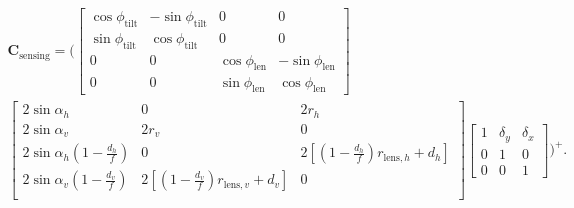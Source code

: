 \begin{multline}
	\mathbf{C}_\mathrm{sensing}
	=
	\Biggl(
	\begin{bmatrix}
		\cos\phi_\mathrm{tilt} & -\sin\phi_\mathrm{tilt} & 0 & 0\\
		\sin\phi_\mathrm{tilt} & \cos\phi_\mathrm{tilt} & 0 & 0\\
		0 & 0 & \cos\phi_\mathrm{len} & -\sin\phi_\mathrm{len} \\
		0 & 0 & \sin\phi_\mathrm{len} & \cos\phi_\mathrm{len}
	\end{bmatrix}\\
	\begin{bmatrix}
		2\sin\alpha_h & 0 & 2r_h\\
		2\sin\alpha_v & 2r_v & 0\\
		2\sin\alpha_h\left(1-\frac{d_h}{f}\right) & 0 & 2\left[\left(1-\frac{d_h}{f}\right)r_{\mathrm{lens},h}+d_h\right]\\
		2\sin\alpha_v\left(1-\frac{d_v}{f}\right) &  2\left[\left(1-\frac{d_v}{f}\right)r_{\mathrm{lens},v}+d_v\right] & 0\\
	\end{bmatrix}
	\begin{bmatrix}
		1 & \delta_y & \delta_x\\
		0 & 1 & 0\\
		0 & 0 & 1
	\end{bmatrix}
	\Biggr)^{+}.
	\label{eqn:sensing_matrix_misalign}
\end{multline}

